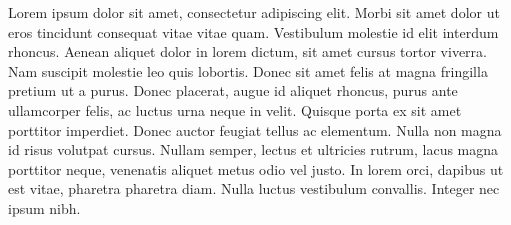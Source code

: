 \begin{resumo}
    Lorem ipsum dolor sit amet, consectetur adipiscing elit. Morbi sit amet dolor ut eros tincidunt consequat vitae vitae quam. Vestibulum molestie id elit interdum rhoncus. Aenean aliquet dolor in lorem dictum, sit amet cursus tortor viverra. Nam suscipit molestie leo quis lobortis. Donec sit amet felis at magna fringilla pretium ut a purus. Donec placerat, augue id aliquet rhoncus, purus ante ullamcorper felis, ac luctus urna neque in velit. Quisque porta ex sit amet porttitor imperdiet. Donec auctor feugiat tellus ac elementum. Nulla non magna id risus volutpat cursus. Nullam semper, lectus et ultricies rutrum, lacus magna porttitor neque, venenatis aliquet metus odio vel justo. In lorem orci, dapibus ut est vitae, pharetra pharetra diam. Nulla luctus vestibulum convallis. Integer nec ipsum nibh.
\end{resumo}
